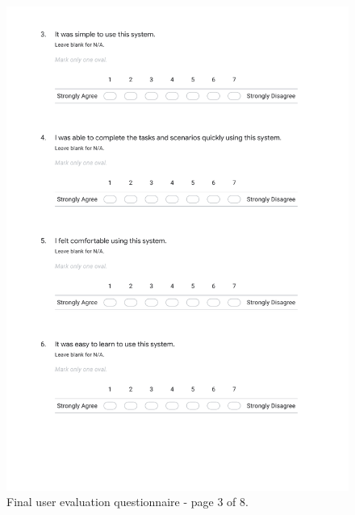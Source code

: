 \documentclass{l4proj}
\begin{document}
\begin{appendices}
\begin{figure}[htb]
    \centering
    \includegraphics[width=\linewidth]{images/final_evaluation_3.pdf}    
    \caption{Final user evaluation questionnaire - page 3 of 8.}
    \label{fig:final_evaluation_3} 
\end{figure}


\end{appendices}
\end{document}
